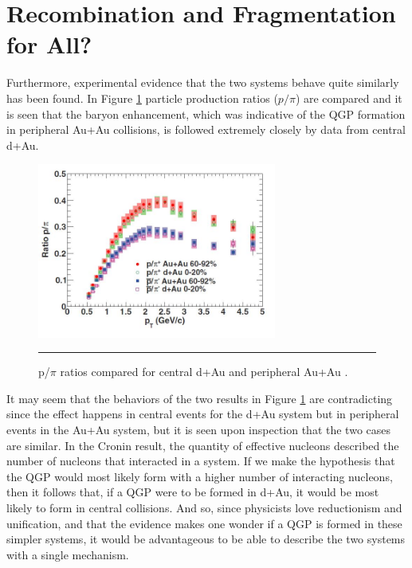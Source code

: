 \section{Recombination and Fragmentation for All?}
\label{sect:recombcold}
Furthermore, experimental evidence that the two systems behave quite similarly has been found. In Figure \ref{fig:daaaratios} particle production ratios ($p/\pi$) are compared and it is seen that the baryon enhancement, which was indicative of the QGP formation in peripheral Au+Au collisions, is followed extremely closely by data from central d+Au. 

\begin{figure}[htbp!]
  \centering    
    \includegraphics[width=0.7\textwidth]{prevplots/dAvsAAratios.JPG}
\rule{35em}{0.5pt}
  \caption[p/$\pi$ ratios compared for central d+Au and peripheral Au+Au]{p/$\pi$ ratios compared for central d+Au and peripheral Au+Au \citep{PhysRevC.88.024906}.}
  \label{fig:daaaratios}    
\end{figure} 

It may seem that the behaviors of the two results in Figure \ref{fig:daaaratios} are contradicting since the effect happens in central events for the d+Au system but in peripheral events in the Au+Au system, but it is seen upon inspection that the two cases are similar. In the Cronin result, the quantity of effective nucleons described the number of nucleons that interacted in a system. If we make the hypothesis that the QGP would most likely form with a higher number of interacting nucleons, then it follows that, if a QGP were to be formed in d+Au, it would be most likely to form in central collisions. And so, since physicists love reductionism and unification, and that the evidence makes one wonder if a QGP is formed in these simpler systems, it would be advantageous to be able to describe the two systems with a single mechanism.


